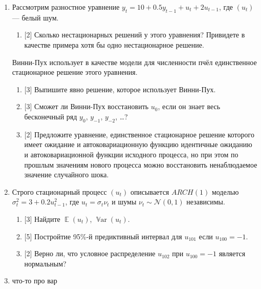 \documentclass[12pt]{article}
\DeclareMathOperator{\Var}{\mathbb{V}ar}
\DeclareMathOperator{\E}{\mathbb{E}}
\newcommand{\cN}{\mathcal{N}}
\begin{document}
\begin{enumerate}
    \item Рассмотрим разностное уравнение $y_t = 10 + 0.5 y_{t-1} + u_{t} + 2 u_{t-1}$, где $(u_t)$ — белый шум. 
    \begin{enumerate}
        \item {[2]} Сколько нестационарных решений у этого уравнения? Привидете в качестве примера хотя бы одно нестационарное решение. 
    \end{enumerate}
    Винни-Пух использует в качестве модели для численности пчёл единственное стационарное решение этого уравнения. 
    \begin{enumerate}[resume]
        \item {[3]} Выпишите явно решение, которое использует Винни-Пух. 
        \item {[3]} Сможет ли Винни-Пух восстановить $u_0$, если он знает весь бесконечный ряд $y_0$, $y_{-1}$, $y_{-2}$, \dots?
        \item {[2]} Предложите уравнение, единственное стационарное решение которого имеет ожидание и автоковариационную функцию идентичные ожиданию и автоковариационной функции исходного процесса,
        но при этом по прошлым значениям нового процесса можно восстановить ненаблюдаемое значение случайного шока. 
    \end{enumerate}

    \item   Строго стационарный процесс $(u_t)$ описывается $ARCH(1)$ моделью $\sigma^2_t = 3 + 0.2 u_{t-1}^2$, где 
    $u_t = \sigma_t \nu_t$ и шумы $\nu_t \sim \cN(0, 1)$ независимы.
    \begin{enumerate}
        \item {[3]} Найдите $\E(u_t)$, $\Var(u_t)$.
        \item {[5]} Постройтие 95\%-й предиктивный интервал для $u_{101}$ если $u_{100} = -1$.
        \item {[2]} Верно ли, что условное распределение $u_{102}$ при $u_{100} = -1$ является нормальным?
    \end{enumerate}

    \item что-то про вар

\end{enumerate}
\end{document}
